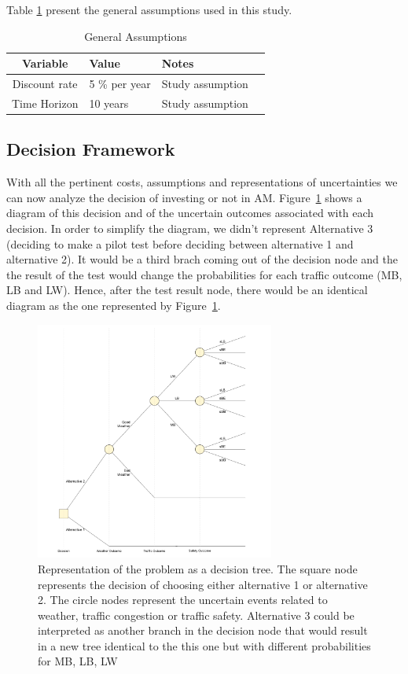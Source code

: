 \documentclass[11pt, letterpaper]{article}
\begin{document}
Table \ref{tab:assumptions} present the general assumptions used in this study.

\begin{table}[h]
\caption{General Assumptions}
\centering
\renewcommand{\arraystretch}{1.1}
\begin{tabular}{c l l l}
\hline
Variable 							& Value 				& Notes 			\\\hline\hline
Discount rate						& 5 \% per year			& Study assumption		\\
Time Horizon						& 10 years			& Study assumption		\\\hline
\end{tabular}
\label{tab:assumptions}
\end{table}%

\subsection{Decision Framework}

With all the pertinent costs, assumptions and representations of uncertainties we can now analyze
the decision of investing or not in AM.  Figure~\ref{decisiontree} shows a diagram of this decision and of the
uncertain outcomes associated with each decision. In order to simplify the diagram, we didn't represent
Alternative 3 (deciding to make a pilot test before deciding between alternative 1 and alternative 2). It would be a
third brach coming out of the decision node and the the result of the test would change the probabilities for each
traffic outcome (MB, LB and LW). Hence, after the test result node, there would be an identical diagram as the one represented
by Figure~\ref{decisiontree}.

\begin{figure}[h]
\centering
\includegraphics[width=0.7\textwidth]{../../R/decisiontree.png}
\caption{Representation of the problem as a decision tree. The square node represents the decision of choosing either alternative 1 or alternative 2. The circle nodes represent the uncertain events related to weather, traffic congestion or traffic safety. Alternative 3 could be interpreted as another branch in the decision node that would result in a new tree identical to the this one but with different probabilities for MB, LB, LW}
\label{decisiontree}
\end{figure}
\end{document}
